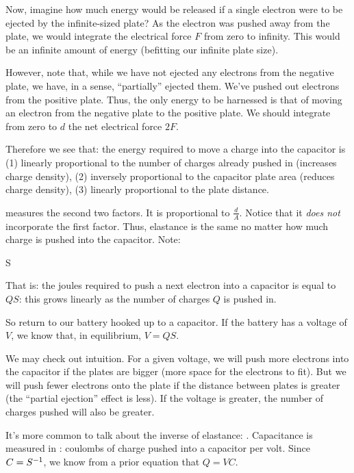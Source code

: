 \documentclass[11pt, oneside]{amsart}
\begin{document}

Now, imagine how much energy would be released if a single electron were
to be ejected by the infinite-sized plate? As the electron was pushed
away from the plate, we would integrate the electrical force $F$ from
zero to infinity. This would be an infinite amount of energy (befitting
our infinite plate size).

However, note that, while we have not ejected any electrons from the
negative plate, we have, in a sense, ``partially'' ejected them. We've
pushed out electrons from the positive plate. Thus, the only energy to
be harnessed is that of moving an electron from the negative plate to
the positive plate. We should integrate from zero to $d$ the net
electrical force $2F$.

Therefore we see that: the energy required to move a charge into the
capacitor is (1) linearly proportional to the number of charges already
pushed in (increases charge density), (2) inversely proportional to the
capacitor plate area (reduces charge density), (3) linearly proportional
to the plate distance.

 measures the second two factors. It is proportional
to $\frac{d}{A}$. Notice that it \emph{does not} incorporate the first
factor. Thus, elastance is the same no matter how much charge is pushed
into the capacitor. Note:

\begin{nedqn}
\eqcol
  S
\end{nedqn}

That is: the joules required to push a next electron into a capacitor is
equal to $QS$: this grows linearly as the number of charges $Q$ is
pushed in.

So return to our battery hooked up to a capacitor. If the battery has a
voltage of $V$, we know that, in equilibrium, $V = QS$.

We may check out intuition. For a given voltage, we will push more
electrons into the capacitor if the plates are bigger (more space for
the electrons to fit). But we will push fewer electrons onto the plate
if the distance between plates is greater (the ``partial ejection''
effect is less). If the voltage is greater, the number of charges pushed
will also be greater.

It's more common to talk about the inverse of elastance:
. Capacitance is measured in :
coulombs of charge pushed into a capacitor per volt. Since $C =
{S}^{-1}$, we know from a prior equation that $Q = VC$.
\end{document}
